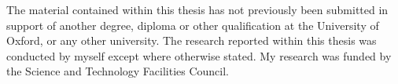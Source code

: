 The material contained within this thesis has not previously been submitted in support of another degree, diploma or other qualification at the University of Oxford, or any other university. The research reported within this thesis was conducted by myself except where otherwise stated. My research was funded by the Science and Technology Facilities Council.
